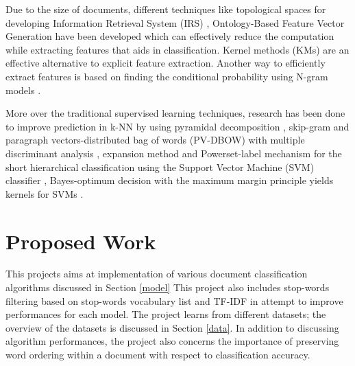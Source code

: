 \documentclass[10pt,twocolumn,letterpaper]{article}
\begin{document}
Due to the size of documents, different techniques like topological spaces for developing Information Retrieval System (IRS) \cite{parlak2018feature},  Ontology-Based Feature Vector Generation \cite{elhadad2018novel} have been developed which can effectively reduce the computation while extracting features that aids in classification. Kernel methods (KMs) are an effective alternative to explicit feature extraction. Another way to efficiently extract features is based on finding the conditional probability using N-gram models \cite{furnkranz1998study} .

More over the traditional supervised learning techniques, research has been done to improve prediction in k-NN by using pyramidal decomposition \cite{heroux1998classification},  skip-gram and paragraph vectors-distributed bag of words (PV-DBOW) with multiple discriminant analysis \cite{lauren2018discriminant}, expansion method and Powerset-label mechanism for the short hierarchical classification using the Support Vector Machine (SVM) classifier \cite{salih2018term}, Bayes-optimum decision with the maximum margin principle yields kernels for SVMs \cite{ding2014sensing}.

\section{Proposed Work}
This projects aims at implementation of various document classification algorithms discussed in Section \ref{model}
This project also includes stop-words filtering based on stop-words vocabulary list and TF-IDF in attempt to improve performances for each model. The project learns from different datasets; the overview of the datasets is discussed in Section \ref{data}. In addition to discussing algorithm performances, the project also concerns the importance of preserving word ordering within a document with respect to classification accuracy. 
\end{document}
